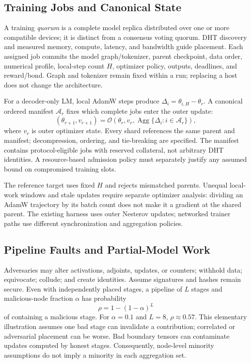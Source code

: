 \documentclass[conference]{IEEEtran}
\begin{document}
\subsection{Training Jobs and Canonical State}
\label{sec:quorum}

A training \emph{quorum} is a complete model replica distributed over one or more compatible devices; it is distinct from a consensus voting quorum. DHT discovery and measured memory, compute, latency, and bandwidth guide placement. Each assigned job commits the model graph/tokenizer, parent checkpoint, data order, numerical profile, local-step count $H$, optimizer policy, outputs, deadlines, and reward/bond. Graph and tokenizer remain fixed within a run; replacing a host does not change the architecture.

For a decoder-only LM, local AdamW steps produce $\Delta_i=\theta_{i,H}-\theta_r$. A canonical ordered manifest $\mathcal A_r$ fixes which complete jobs enter the outer update:
\begin{equation}
 (\theta_{r+1},v_{r+1})=
 \mathcal O\!\left(\theta_r,v_r,
 \operatorname{Agg}\{\Delta_i:i\in\mathcal A_r\}\right),
\end{equation}
where $v_r$ is outer optimizer state. Every shard references the same parent and manifest; decompression, ordering, and tie-breaking are specified. The manifest contains protocol-eligible jobs with reserved collateral, not arbitrary DHT identities. A resource-based admission policy must separately justify any assumed bound on compromised training slots.

The reference target uses fixed $H$ and rejects mismatched parents. Unequal local-work windows and stale updates require separate optimizer analysis: dividing an AdamW trajectory by its batch count does not make it a gradient at the shared parent. The existing harness uses outer Nesterov updates; networked trainer paths use different synchronization and aggregation policies.

\subsection{Pipeline Faults and Partial-Model Work}

Adversaries may alter activations, adjoints, updates, or counters; withhold data; equivocate; collude; and create identities. Assume signatures and hashes remain secure. Even with independently placed stages, a pipeline of $L$ stages and malicious-node fraction $\alpha$ has probability
\begin{equation}
 \rho=1-(1-\alpha)^L
\label{eq:contamination}
\end{equation}
of containing a malicious stage. For $\alpha=0.1$ and $L=8$, $\rho\approx0.57$. This elementary illustration assumes one bad stage can invalidate a contribution; correlated or adversarial placement can be worse. Bad boundary tensors can contaminate updates computed by honest stages. Consequently, node-level minority assumptions do not imply a minority in each aggregation set.
\end{document}
